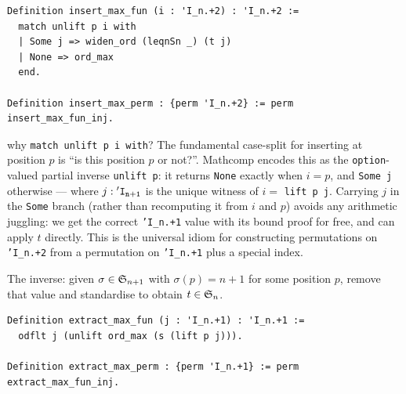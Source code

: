 \begin{lstlisting}[language=Rocq]
Definition insert_max_fun (i : 'I_n.+2) : 'I_n.+2 :=
  match unlift p i with
  | Some j => widen_ord (leqnSn _) (t j)
  | None => ord_max
  end.

Definition insert_max_perm : {perm 'I_n.+2} := perm insert_max_fun_inj.
\end{lstlisting}


\begin{sidebar}{why \texttt{match unlift p i with}?}
The fundamental case-split for inserting at position $p$ is ``is
this position $p$ or not?''. Mathcomp encodes this as the
\texttt{option}-valued partial inverse \texttt{unlift p}: it
returns \texttt{None} exactly when $i = p$, and
\texttt{Some j} otherwise --- where $j : \mathtt{'I_{n+1}}$ is the unique
witness of $i = $ \texttt{lift p j}. Carrying $j$ in the
\texttt{Some} branch (rather than recomputing it from $i$ and $p$)
avoids any arithmetic juggling: we get the correct
\texttt{'I\_n.+1} value with its bound proof for free, and can
apply $t$ directly. This is the universal idiom for constructing
permutations on \texttt{'I\_n.+2} from a permutation on
\texttt{'I\_n.+1} plus a special index.
\end{sidebar}

\begin{definition}
  \label{def:extract_max}
  The inverse: given $\sigma \in \mathfrak{S}_{n+1}$ with $\sigma(p) = n+1$
  for some position $p$, remove that value and standardise to obtain
  $t \in \mathfrak{S}_{n}$.
\end{definition}

\begin{lstlisting}[language=Rocq]
Definition extract_max_fun (j : 'I_n.+1) : 'I_n.+1 :=
  odflt j (unlift ord_max (s (lift p j))).

Definition extract_max_perm : {perm 'I_n.+1} := perm extract_max_fun_inj.
\end{lstlisting}


